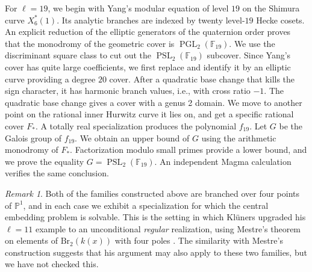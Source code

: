 \documentclass[10pt]{amsart}
\numberwithin{equation}{section}
\theoremstyle{definition}
\theoremstyle{remark}
\newtheorem{remark}[theorem]{Remark}
\newcommand{\PP}{\mathbb P}
\newcommand{\F}{\mathbb{F}}
\newcommand{\PGL}{\operatorname{PGL}}
\newcommand{\PSL}{\operatorname{PSL}}
\begin{document}
For $\ell=19$, we begin with Yang's \cite{YangModularEquations}
modular equation of level $19$ on the Shimura curve $X_6^*(1)$.  Its analytic branches are indexed by twenty level-$19$ Hecke
cosets. An explicit reduction of the elliptic generators of the
quaternion order proves that the monodromy of the geometric cover is $\PGL_2(\F_{19})$. We use the discriminant square class to cut out the $\PSL_2(\F_{19})$ subcover. Since Yang's cover has quite large coefficients, we first replace and identify it by an elliptic curve providing a degree $20$ cover. After a quadratic base change that kills the sign character, it has harmonic branch values, i.e., with cross ratio $-1$. The quadratic base change gives a cover with a genus 2 domain. We move to another point on the rational inner Hurwitz curve it lies on, and get a specific rational cover $F_*$. A totally real specialization produces the polynomial $f_{19}$. Let $G$ be the Galois group of $f_{19}$. We obtain an upper bound of $G$ using the arithmetic monodromy of $F_*$. Factorization modulo small primes provide a lower bound, and we prove the equality $G=\PSL_2(\F_{19})$. An independent Magma calculation verifies the same conclusion.


\begin{remark}\label{rem:regular}
Both of the families constructed above are branched over four points of
$\PP^1$, and in each case we exhibit a specialization for which the central
embedding problem is solvable.  This is the setting in which Kl\"uners
upgraded his $\ell=11$ example to an unconditional \emph{regular}
realization, using Mestre's theorem on elements of $\mathrm{Br}_2(k(x))$ with four poles \cite{Mestre1994b}. The similarity with Mestre's construction suggests that his argument may also apply to these two families, but we have not checked this.
\end{remark}
\end{document}
